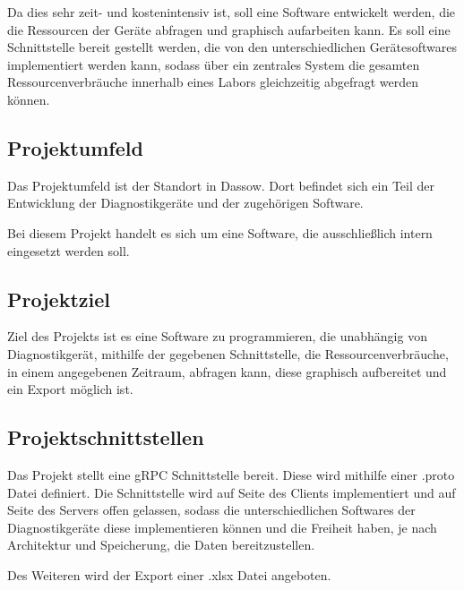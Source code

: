 Da dies sehr zeit- und kostenintensiv ist, soll eine Software entwickelt werden, die die Ressourcen der Geräte abfragen und graphisch aufarbeiten kann. Es soll eine Schnittstelle bereit gestellt werden, die von den unterschiedlichen Gerätesoftwares implementiert werden kann, sodass über ein zentrales System die gesamten Ressourcenverbräuche innerhalb eines Labors gleichzeitig abgefragt werden können.

\subsection{Projektumfeld}
\label{sec:Projektumfeld}
Das Projektumfeld ist der {\betriebNameKzf} Standort in Dassow. Dort befindet sich ein Teil der Entwicklung der Diagnostikgeräte und der zugehörigen Software. 

Bei diesem Projekt handelt es sich um eine Software, die ausschließlich intern eingesetzt werden soll.

\subsection{Projektziel}
\label{sec:Projektziel}
Ziel des Projekts ist es eine Software zu programmieren, die unabhängig von Diagnostikgerät, mithilfe der gegebenen Schnittstelle, die Ressourcenverbräuche, in einem angegebenen Zeitraum, abfragen kann, diese graphisch aufbereitet und ein Export möglich ist.

\subsection{Projektschnittstellen}
\label{sec:Projektschnittstellen}
Das Projekt stellt eine gRPC Schnittstelle bereit. Diese wird mithilfe einer \glqq .proto\grqq \xspace Datei definiert. Die Schnittstelle wird auf Seite des Clients implementiert und auf Seite des Servers offen gelassen, sodass die unterschiedlichen Softwares der Diagnostikgeräte diese implementieren können und die Freiheit haben, je nach Architektur und Speicherung, die Daten bereitzustellen.

Des Weiteren wird der Export einer \glqq .xlsx\grqq \xspace Datei angeboten.